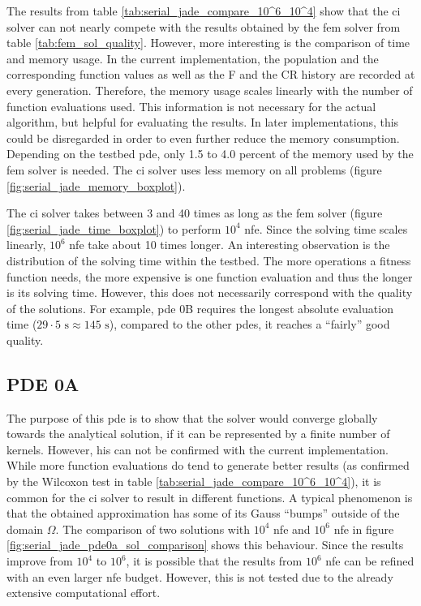 \documentclass[./\jobname.tex]{subfiles}
\begin{document}
The results from table \ref{tab:serial_jade_compare_10^6_10^4} show that the \gls{ci} solver can not nearly compete with the results obtained by the \gls{fem} solver from table \ref{tab:fem_sol_quality}. 
However, more interesting is the comparison of time and memory usage. 
In the current implementation, the population and the corresponding function values as well as the F and the CR history are recorded at every generation. Therefore, the memory usage scales linearly with the number of function evaluations used. This information is not necessary for the actual algorithm, but helpful for evaluating the results. In later implementations, this could be disregarded in order to even further reduce the memory consumption. Depending on the testbed \gls{pde}, only 1.5 to 4.0 percent of the memory used by the \gls{fem} solver is needed. The \gls{ci} solver uses less memory on all problems (figure \ref{fig:serial_jade_memory_boxplot}). 

The \gls{ci} solver takes between 3 and 40 times as long as the \gls{fem} solver (figure \ref{fig:serial_jade_time_boxplot}) to perform $10^4$ \gls{nfe}. Since the solving time scales linearly, $10^6$ \gls{nfe} take about 10 times longer. An interesting observation is the distribution of the solving time within the testbed. The more operations a fitness function needs, the more expensive is one function evaluation and thus the longer is its solving time. However, this does not necessarily correspond with the quality of the solutions. For example, \gls{pde} 0B requires the longest absolute evaluation time ($29 \cdot 5 \text{ s} \approx 145\text{ s}$), compared to the other \gls{pde}s, it reaches a ``fairly'' good quality. 



\subsection{PDE 0A}
\label{chap: experiment_0_pde_0A}

The purpose of this \gls{pde} is to show that the solver would converge globally towards the analytical solution, if it can be represented by a finite number of kernels. However, his can not be confirmed with the current implementation. While more function evaluations do tend to generate better results (as confirmed by the Wilcoxon test in table \ref{tab:serial_jade_compare_10^6_10^4}), it is common for the \gls{ci} solver to result in different functions. A typical phenomenon is that the obtained approximation has some of its Gauss ``bumps'' outside of the domain $\Omega$. The comparison of two solutions with $10^4$ \gls{nfe} and $10^6$ \gls{nfe} in figure \ref{fig:serial_jade_pde0a_sol_comparison} shows this behaviour. Since the results improve from $10^4$ to $10^6$, it is possible that the results from $10^6$ \gls{nfe} can be refined with an even larger \gls{nfe} budget. However, this is not tested due to the already extensive computational effort. 
\end{document}
